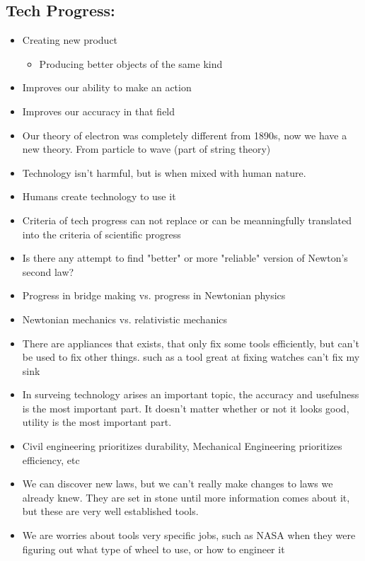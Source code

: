 \documentclass{article}
\begin{document}
\subsection{Tech Progress:}
\begin{itemize}
  \item Creating new product
    \begin{itemize}
      \item Producing better objects of the same kind
    \end{itemize}
  \item Improves our ability to make an action
  \item Improves our accuracy in that field
  \item Our theory of electron was completely different from
    1890s, now we have a new theory.
    From particle to wave (part of string theory)
  \item Technology isn't harmful, but is when
    mixed with human nature.
  \item Humans create technology to use it
  \item Criteria of tech progress can not
    replace or can be meanningfully translated into the
    criteria of scientific progress
  \item Is there any attempt to find "better" or more
    "reliable" version of Newton's second law?
  \item Progress in bridge making vs. progress in Newtonian
    physics
  \item Newtonian mechanics vs. relativistic mechanics
  \item There are appliances that exists, that only fix
    some tools efficiently, but can't be used to fix other things.
    such as a tool great at fixing watches
    can't fix my sink
  \item In surveing technology arises an important topic,
    the accuracy and usefulness is the most important part.
    It doesn't matter whether or not it looks good,
    utility is the most important part.
  \item Civil engineering prioritizes durability,
    Mechanical Engineering prioritizes efficiency, etc
  \item We can discover new laws, but we can't
    really make changes to laws we already knew.
    They are set in stone until more information
    comes about it, but these are very well established
    tools.
  \item We are worries about tools very specific jobs,
    such as NASA when they were figuring out what
    type of wheel to use, or how to engineer it
\end{itemize}
\end{document}
